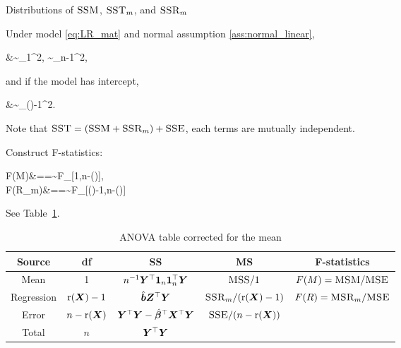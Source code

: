 \documentclass[10pt,a4paper]{book}
\begin{document}
\begin{thmbox}{Distributions of $\textsc{SSM}$, $\textsc{SST}_m$, and $\textsc{SSR}_m$}
\begin{proposition}\label{prop:LR_SSM_dist}
	Under model \eqref{eq:LR_mat} and normal assumption \ref{ass:normal_linear},
	\begin{salign*}
		&\sim\chi_1^2,\quad 
		\sim\chi_{n-1}^2,
	\end{salign*}
	and if the model has intercept,
	\begin{salign*}
		&\sim\chi_{\rmr(\X)-1}^2\sbk{\frac{\b^\TT(\Z^\TT\Z)\b}{\sigma^2}}.
	\end{salign*}
	Note that $\textsc{SST}=(\textsc{SSM}+\textsc{SSR}_m)+\textsc{SSE}$, each terms are mutually independent. 
\end{proposition}	
\end{thmbox}
Construct F-statistics:
\begin{salign*}
	F(M)&=\frac{\MSM}{\MSE}=\sim \textsc{F}_{[1,n-\rmr(\X)]},\\
	F(R_m)&==\sim\textsc{F}_{[\rmr(\X)-1,n-\rmr(\X)]}
\end{salign*}
See Table~\ref{tab:LR_ANOVA_mean_correct}.

\begin{table}\label{tab:LR_ANOVA_mean_correct}
	\centering
	\caption{ANOVA table corrected for the mean}
	\begin{tabular}{ccccc}\hline
	Source & df & SS & MS & F-statistics \\ \hline
	Mean & 1 & $n^{-1}{\boldsymbol Y}^\top{\boldsymbol 1}_n{\boldsymbol 1}_n^\top{\boldsymbol Y}$ & $\textsc{MSS}/1$ & $F(M)=\textsc{MSM}/\textsc{MSE}$ \\ \hline  
	Regression & $\mathrm{r}({\boldsymbol X})-1$ & $\hat{{\boldsymbol b}}{\boldsymbol Z}^\top{\boldsymbol Y}$ & $\textsc{SSR}_m/(\mathrm{r}({\boldsymbol X})-1)$ & $F(R)=\textsc{MSR}_m/\textsc{MSE}$  \\
	Error & $n-\mathrm{r}({\boldsymbol X})$ & ${\boldsymbol Y}^\top{\boldsymbol Y}-\hat{{\boldsymbol\beta}}^\top{\boldsymbol X}^\top{\boldsymbol Y}$ & $\textsc{SSE}/(n-\mathrm{r}({\boldsymbol X}))$ & \\ \hline
	Total & $n$ & ${\boldsymbol Y}^\top{\boldsymbol Y}$  &  &  \\ \hline
	\end{tabular}
\end{table}
\end{document}
